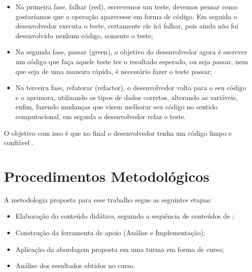 \documentclass[pnumabnt,normaltoc,espacoumemeio,capchap]{abnt}
\begin{document}
\begin{itemize}
	\item Na primeira fase, falhar (red), escrevemos um teste, devemos pensar como gostaríamos que a operação aparecesse em forma de código. Em seguida o desenvolvedor executa o teste, certamente ele irá falhar, pois ainda não foi desenvolvido nenhum código, somente o teste;
	\item Na segunda fase, passar (green), o objetivo do desenvolvedor agora é escrever um código que faça aquele teste ter o resultado esperado, ou seja passar, nem que seja de uma maneira rápida, é necessário fazer o teste passar;
	\item Na terceira fase, refatorar (refactor), o desenvolvedor volta para o seu código e o aprimora, utilizando os tipos de dados corretos, alterando as variáveis, enfim, fazendo mudanças que visem melhorar seu código no sentido computacional, em seguida o desenvolvedor refaz o teste.
\end{itemize}
\par O objetivo com isso é que no final o desenvolvedor tenha um código limpo e confiável \cite{KB2003}.


\chapter{Procedimentos Metodológicos}
\par A metodologia proposta para esse trabalho segue as seguintes etapas:
\begin{itemize}
\item Elaboração do conteúdo didático, seguindo a sequência de conteúdos de ;
\item Construção da ferramenta de apoio (Análise e Implementação);
\item Aplicação da abordagem proposta em uma turma em forma de curso;
\item Análise dos resultados obtidos no curso. 
\end{itemize}
\end{document}
